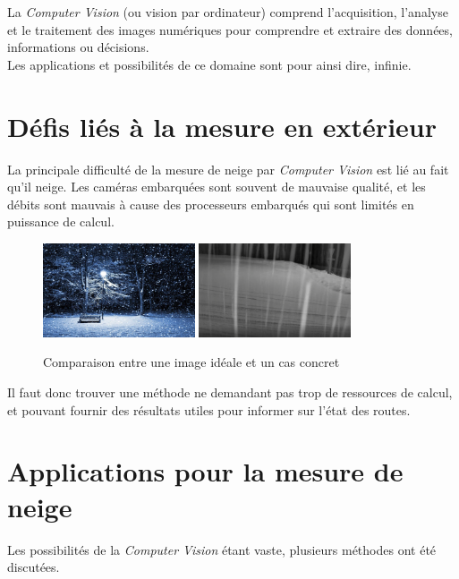 La \emph{Computer Vision} (ou vision par ordinateur) comprend l'acquisition, l'analyse et
le traitement des images numériques pour comprendre et extraire des données, informations
ou décisions.\\
Les applications et possibilités de ce domaine sont pour ainsi dire, infinie.

\section{Défis liés à la mesure en extérieur}
La principale difficulté de la mesure de neige par \emph{Computer Vision} est lié au fait
qu'il neige. Les caméras embarquées sont souvent de mauvaise qualité, et les débits
sont mauvais à cause des processeurs embarqués qui sont limités en puissance de calcul.

\begin{figure}[H]
    \centering
    \includegraphics[width=0.4\textwidth]{Images/computer_vision/perfect_snow.jpg}
    \includegraphics[width=0.4\textwidth]{Images/computer_vision/real_snow.png}
    \caption[Comparaison image de neige HD et cas concret]{Comparaison entre une image idéale \footnotemark[1] et un cas concret\footnotemark[2]}
    \label{fig:Snow comparison}
\end{figure}

\noindent
Il faut donc trouver une méthode ne demandant pas trop de ressources de calcul, et pouvant fournir
des résultats utiles pour informer sur l'état des routes.

\section{Applications pour la mesure de neige}
Les possibilités de la \emph{Computer Vision} étant vaste, plusieurs méthodes ont été discutées.

